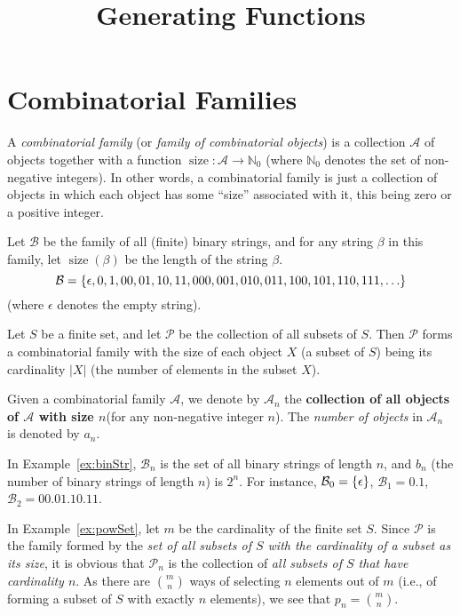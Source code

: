 \documentclass[11pt,a5paper]{amsart}
\title{Generating Functions}
\date{}
\newcommand{\cat}{\mathcal}
\DeclareMathOperator{\size}{size}
\begin{document}
\maketitle

\section{Combinatorial Families}\label{sec:combFam}
A \emph{combinatorial family} (or \emph{family of combinatorial objects}) is a collection $\cat A$ of objects together with a function $\size \colon \cat A \to \mathbb N_0$ (where $\mathbb N_0$ denotes the set of non-negative integers). In other words, a combinatorial family is just a collection of objects in which each object has some ``size'' associated with it, this being zero or a positive integer.

\begin{Example}[label=ex:binStr]
Let $\cat B$ be the family of all (finite) binary strings, and for any string $\beta$ in this family, let $\size(\beta)$ be the length of the string $\beta$.
\begin{equation*}
\cat B = \qty{\epsilon, 0, 1, 00, 01, 10, 11, 000, 001, 010, 011, 100, 101, 110, 111, \ldots}
\end{equation*}
(where $\epsilon$ denotes the empty string).
\end{Example}

\begin{Example}[label=ex:powSet]
Let $S$ be a finite set, and let $\cat P$ be the collection of all subsets of $S$. Then $\cat P$ forms a combinatorial family with the size of each object $X$ (a subset of $S$) being its cardinality $|X|$ (the number of elements in the subset $X$).
\end{Example}

Given a combinatorial family $\cat A$, we denote by $\cat A_n$ the \textbf{collection of all objects of $\cat A$ with size $n$}(for any non-negative integer $n$). The \emph{number of objects} in $\cat A_n$ is denoted by $a_n$.

In Example~\ref{ex:binStr}, $\cat B_n$ is the set of all binary strings of length $n$, and $b_n$ (the number of binary strings of length $n$) is $2^n$. For instance,
$\cat B_0 = \qty{\epsilon}$, $\cat B_1 = \qty{0, 1}$, $\cat B_2 = \qty{00, 01, 10, 11}$.

In Example~\ref{ex:powSet}, let $m$ be the cardinality of the finite set $S$. Since $\cat P$ is the family formed by the \emph{set of all subsets of $S$ with the cardinality of a subset as its size}, it is obvious that $\cat P_n$ is the collection of \emph{all subsets of $S$ that have cardinality $n$}. As there are $\binom m n$ ways of selecting $n$ elements out of $m$ (i.e., of forming a subset of $S$ with exactly $n$ elements), we see that $p_n = \binom m n$.
\end{document}
